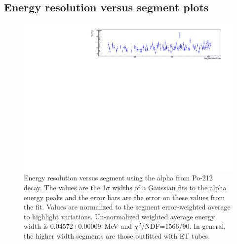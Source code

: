 \subsection{Energy resolution versus segment plots}
\begin{figure}[!h]
\centering
\includegraphics[width=1.05\textwidth]{figures/PubBiPo212EresvsCell.pdf}
\caption{\label{fig:EresvsCell212}Energy resolution versus segment using the alpha from Po-212 decay. The values are the 1$\sigma$ widths of a Gaussian fits to the alpha energy peaks and the error bars are the error on these values from the fit. Values are normalized to the segment error-weighted average to highlight variations. Un-normalized weighted average energy width is 0.04572$\pm$0.00009~MeV and $\chi^2$/NDF=1566/90.  In general, the higher width segments are those outfitted with ET tubes.}
\end{figure}
